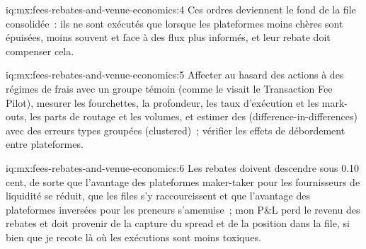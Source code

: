 \begin{solution}{iq:mx:fees-rebates-and-venue-economics:4}
Ces ordres deviennent le fond de la file consolidée~: ils ne sont exécutés que lorsque les plateformes moins chères sont épuisées, moins souvent et face à des flux plus informés, et
leur rebate doit compenser cela.
\end{solution}

\begin{solution}{iq:mx:fees-rebates-and-venue-economics:5}
Affecter au hasard des actions à des régimes de frais avec un groupe témoin (comme le visait le Transaction Fee Pilot), mesurer les fourchettes, la profondeur, les taux d'exécution et les mark-outs,
les parts de routage et les volumes, et estimer des  (difference-in-differences) avec des erreurs types groupées (clustered)~; vérifier les effets de débordement entre plateformes.
\end{solution}

\begin{solution}{iq:mx:fees-rebates-and-venue-economics:6}
Les rebates doivent descendre sous 0.10 cent, de sorte que l'avantage des plateformes maker-taker pour les fournisseurs de liquidité se réduit, que les files s'y raccourcissent et que l'avantage
des plateformes inversées pour les preneurs s'amenuise~; mon P\&L perd le revenu des rebates et doit provenir de la capture du spread et de la position dans la file, si bien que je recote là où les exécutions sont moins toxiques.
\end{solution}
